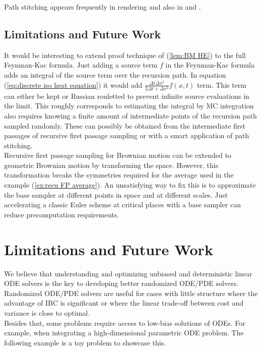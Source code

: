 \documentclass[a4paper,12pt]{article}
\begin{document}
\begin{related}
    Path stitching appears frequently in rendering and also in \cite{das_sarma_fast_2015}
    and \cite{ji_reusing_2012}.
\end{related}

\subsection{Limitations and Future Work}

It would be interesting to extend proof technique of (\ref{lem:BM HE}) to the full
Feynman-Kac formula. Just adding a source term $f$ in the Feynman-Kac formula adds
an integral of the source term over the recursion path.
In equation (\ref{eq:discrete iso heat equation})
it would add $\frac{\Delta t \Delta x^{2}}{2 \Delta t + \Delta x ^{2}} f(x,t)$
term. This term can either be kept or Russian rouletted
to prevent infinite source evaluations in the limit.
This roughly corresponds to estimating the integral by
MC integration also requires knowing a finite amount of
intermediate points of the recursion path
sampled randomly. These can possibly be obtained from
the intermediate first passages of recursive first passage sampling or with a smart
application of path stitching. \\


Recursive first passage sampling for Brownian motion can be extended to geometric
Brownian motion by transforming the space. However, this transformation breaks
the symmetries required for the average used in the example (\ref{ex:recu FP average}).
An unsatisfying way to fix this is to approximate the base sampler at different points in
space and at different scales. Just accelerating a classic Euler scheme at critical places
with a base sampler can reduce precomputation requirements.


\section{Limitations and Future Work}

We believe that understanding and optimizing unbiased and deterministic linear ODE solvers
is the key to developing better randomized ODE/PDE solvers.
Randomized ODE/PDE solvers are useful for cases with little structure
where the advantage of IBC is significant or where the linear trade-off
between cost and variance is close to optimal. \\


Besides that, some problems require access to low-bias solutions of
ODEs. For example, when integrating a high-dimensional parametric ODE problem.
The following example is a toy problem to showcase this.
\end{document}
